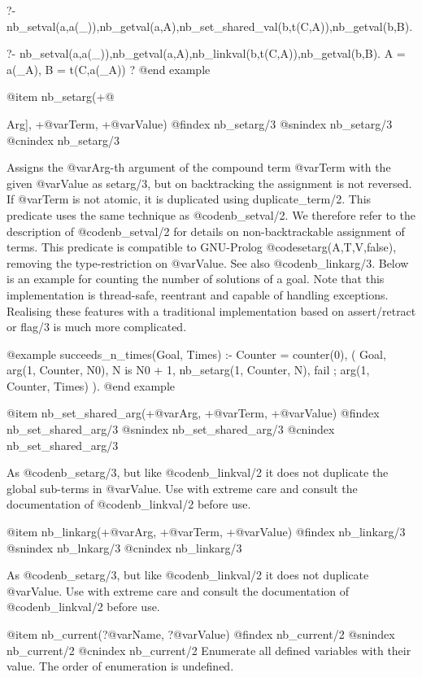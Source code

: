 {{{{{?- nb_setval(a,a(_)),nb_getval(a,A),nb_set_shared_val(b,t(C,A)),nb_getval(b,B).

?- nb_setval(a,a(_)),nb_getval(a,A),nb_linkval(b,t(C,A)),nb_getval(b,B).
A = a(_A),
B = t(C,a(_A)) ?
@end example

@item nb_setarg(+@{Arg], +@var{Term}, +@var{Value})
@findex nb_setarg/3
@snindex nb_setarg/3
@cnindex nb_setarg/3

Assigns the @var{Arg}-th argument of the compound term @var{Term} with
the given @var{Value} as setarg/3, but on backtracking the assignment
is not reversed. If @var{Term} is not atomic, it is duplicated using
duplicate_term/2. This predicate uses the same technique as
@code{nb_setval/2}. We therefore refer to the description of
@code{nb_setval/2} for details on non-backtrackable assignment of
terms. This predicate is compatible to GNU-Prolog
@code{setarg(A,T,V,false)}, removing the type-restriction on
@var{Value}. See also @code{nb_linkarg/3}. Below is an example for
counting the number of solutions of a goal. Note that this
implementation is thread-safe, reentrant and capable of handling
exceptions. Realising these features with a traditional implementation
based on assert/retract or flag/3 is much more complicated.

@example
    succeeds_n_times(Goal, Times) :-
            Counter = counter(0),
            (   Goal,
                arg(1, Counter, N0),
                N is N0 + 1,
                nb_setarg(1, Counter, N),
                fail
            ;   arg(1, Counter, Times)
            ).
@end example

@item nb_set_shared_arg(+@var{Arg}, +@var{Term}, +@var{Value}) 
@findex nb_set_shared_arg/3
@snindex nb_set_shared_arg/3
@cnindex nb_set_shared_arg/3

As @code{nb_setarg/3}, but like @code{nb_linkval/2} it does not
duplicate the global sub-terms in @var{Value}. Use with extreme care
and consult the documentation of @code{nb_linkval/2} before use.

@item nb_linkarg(+@var{Arg}, +@var{Term}, +@var{Value}) 
@findex nb_linkarg/3
@snindex nb_lnkarg/3
@cnindex nb_linkarg/3

As @code{nb_setarg/3}, but like @code{nb_linkval/2} it does not
duplicate @var{Value}. Use with extreme care and consult the
documentation of @code{nb_linkval/2} before use.


@item nb_current(?@var{Name}, ?@var{Value}) 
@findex nb_current/2
@snindex nb_current/2
@cnindex nb_current/2
Enumerate all defined variables with their value. The order of
enumeration is undefined. 

}}}}}}
